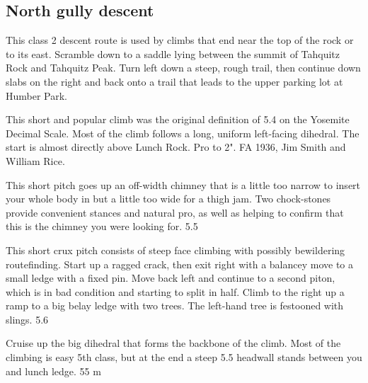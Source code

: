 \documentclass{tahquitz}
\begin{document}
\subsection{North gully descent}\label{subsec:north-gully-descent}

This class 2 descent route is used by climbs that end near the top of the rock or to its
east. Scramble down to a saddle lying between the summit of Tahquitz Rock and Tahquitz
Peak. Turn left down a steep, rough trail, then continue down slabs on the right and
back onto a trail that leads to the upper parking lot at Humber Park.



\normalparindent





This short and popular climb was the original definition of 5.4 on the Yosemite Decimal Scale.
Most of the climb follows a long, uniform left-facing dihedral.
The start is almost directly above Lunch Rock. Pro to 2". FA
1936, Jim Smith and William Rice.

 This short pitch goes up an off-width chimney that is a little too
narrow to insert your whole body in but a little too wide for a thigh jam.
Two chock-stones provide convenient stances and natural pro, as well as helping
to confirm that this is the chimney you were looking for. 5.5

 This short crux pitch consists of steep face climbing with
possibly bewildering routefinding. Start up a ragged crack, then
exit right with a balancey move to a small ledge with a fixed pin.
Move back left and continue to a second piton, which is in bad condition
and starting to split in half. Climb to the right up a ramp to a big belay
ledge with two trees. The left-hand tree is festooned with slings. 5.6

 Cruise up the big dihedral that forms the backbone of the climb.
Most of the climbing is easy 5th class, but at the end a steep 5.5 headwall
stands between you and lunch ledge. 55 m

\end{document}
